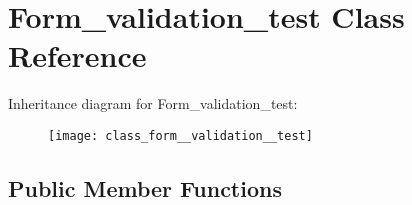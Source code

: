 \hypertarget{class_form__validation__test}{}\section{Form\+\_\+validation\+\_\+test Class Reference}
\label{class_form__validation__test}
Inheritance diagram for Form\+\_\+validation\+\_\+test\+:\begin{figure}[H]
\begin{center}
\leavevmode
\texttt{[image: class\_form\_\_validation\_\_test]}
\end{center}
\end{figure}
\subsection*{Public Member Functions}
